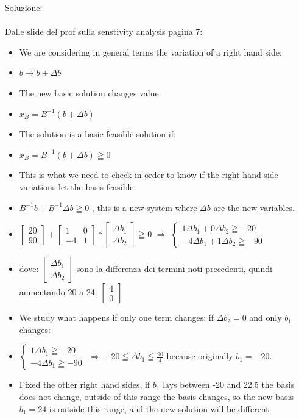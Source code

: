\documentclass{article}
\begin{document}
Soluzione:\\
\\
Dalle slide del prof sulla senstivity analysis pagina 7:\\
\begin{itemize}
\item We are considering in general terms the variation of a right hand side:
\item $b \rightarrow b + \Delta b$
\item The new basic solution changes value:
\item $x_B = B^{-1} (b + \Delta b)$
\item The solution is a basic feasible solution if:
\item $x_B = B^{-1} (b + \Delta b) \geqq 0$
\item This is what we need to check in order to know if the right hand side variations let the basis feasible:
\item $B^{-1} b + B^{-1} \Delta b \geqq 0 $ , this is a new system where $\Delta b$ are the new variables.
\item $ \left[ \begin{array}{cc} 20 \\ 90  \end{array} \right] + \left[\begin{array}{cc} 1 & 0  \\ -4 & 1  \end{array} \right] * \left[ \begin{array}{cc} \Delta b_1 \\ \Delta b_2  \end{array} \right] \geqq 0$ $\Rightarrow$ $\left\{ \begin{array}{rcl} 1 \Delta b_1 + 0 \Delta b_2 \geqq -20 \\ -4 \Delta b_1 + 1 \Delta b_2 \geqq -90  \end{array}\right.$ 
\item dove: $ \left[ \begin{array}{cc} \Delta b_1 \\ \Delta b_2  \end{array} \right] $ sono la differenza dei termini noti precedenti, quindi aumentando 20 a 24:  $ \left[\begin{array}{cc} 4 \\ 0  \end{array} \right] $
\item We study what happens if only one term changes: if $ \Delta b_2 = 0$ and only $b_1$ changes:
\item $\left\{ \begin{array}{rcl}
1 \Delta b_1 \geqq -20 \\ -4 \Delta b_1 \geqq -90  \end{array}\right.$ $\Rightarrow$ $-20 \leqq \Delta b_1 \leqq \frac{90}{4}$ because originally $b_1 = -20$.
\item Fixed the other right hand sides, if $b_1$ lays between -20 and 22.5 the basis does not change, outside of this range the basis changes, so the new basis $b_1 = 24$ is outside this range, and the new solution will be different.
\end{itemize}
\end{document}

